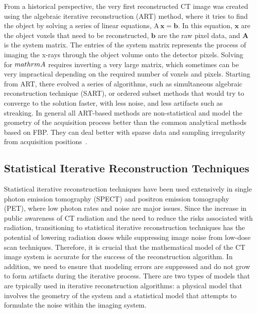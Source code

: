 From a historical perspective, the very first reconstructed CT image was created using the algebraic iterative reconstruction (ART) method, where it tries to find the object by solving a series of linear equations, $\mathrm{A\,\mathbf{x} = \mathbf{b}}$.  In this equation, $\mathrm{\mathbf{x}}$ are the object voxels that need to be reconstructed, $\mathrm{\mathbf{b}}$ are the raw pixel data, and $\mathrm{\mathbf{A}}$ is the system matrix.  The entries of the system matrix represents the process of imaging the x-rays through the object volume onto the detector pixels.  Solving for $\\mathrm{A}$ requires inverting a very large matrix, which sometimes can be very impractical depending on the required number of voxels and pixels.  Starting from ART, there evolved a series of algorithms, such as simultaneous algebraic reconstruction technique (SART), or ordered subset methods that would try to converge to the solution faster, with less noise, and less artifacts such as streaking.  In general all ART-based methods are non-statistical and model the geometry of the acquisition process better than the common analytical methods based on FBP.  They can deal better with sparse data and sampling irregularity from acquisition positions~\citep{Beister2012}.

\subsection{Statistical Iterative Reconstruction Techniques}
Statistical iterative reconstruction techniques have been used extensively in single photon emission tomography (SPECT) and positron emission tomography (PET), where low photon rates and noise are major issues.  Since the increase in public awareness of CT radiation and the need to reduce the risks associated with radiation, transitioning to statistical iterative reconstruction techniques has the potential of lowering radiation doses while suppressing image noise from low-dose scan techniques.  Therefore, it is crucial that the mathematical model of the CT image system is accurate for the success of the reconstruction algorithm.  In addition, we need to ensure that modeling errors are suppressed and do not grow to form artifacts during the iterative process.  There are two types of models that are typically used in iterative reconstruction algorithms: a physical model that involves the geometry of the system and a statistical model that attempts to formulate the noise within the imaging system.

